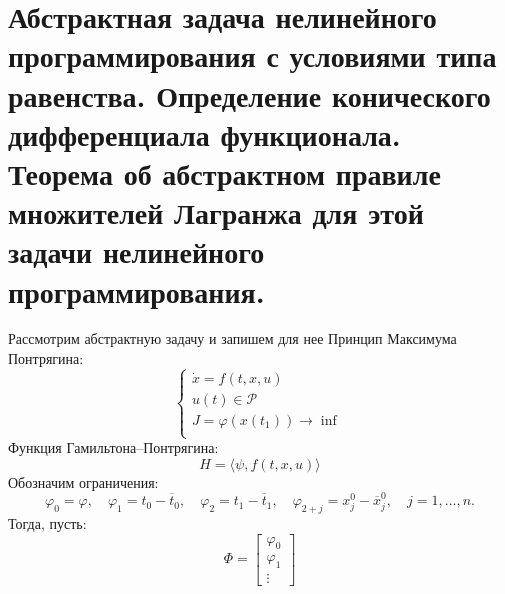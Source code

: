 \documentclass[oneside, final, 14pt, draft]{article}
\theoremstyle{definition}
\theoremstyle{definition}
\theoremstyle{remark}
\theoremstyle{theorem}
\renewcommand{\phi}{\varphi}
\begin{document}
\section{Абстрактная задача нелинейного программирования с условиями типа равенства. Определение конического дифференциала функционала. Теорема об абстрактном правиле множителей Лагранжа для этой задачи нелинейного программирования.}
Рассмотрим абстрактную задачу и запишем для нее Принцип Максимума Понтрягина:
\begin{equation}\label{ssystem}
\begin{cases}
\dot{x} = f(t, x, u)\\
u(t) \in \mathcal{P}\\
J = \phi(x(t_1)) \rightarrow \inf\\
\end{cases}
\end{equation}
Функция Гамильтона--Понтрягина:
$$H = \langle \psi,f(t, x, u)\rangle$$
Обозначим ограничения:
$$
 \phi_0 = \phi,\quad \phi_1 = t_0 - \overline{t}_0,\quad \phi_2 = t_1 - \overline{t}_1, \quad \phi_{2+j} = x_j^0 - \overline{x}_j^0, \quad j=1,\ldots, n.
$$
Тогда, пусть:
$$
\Phi = \begin{bmatrix}
            \phi_0\\
            \phi_1\\
            \vdots
   \end{bmatrix}
$$
\end{document}

